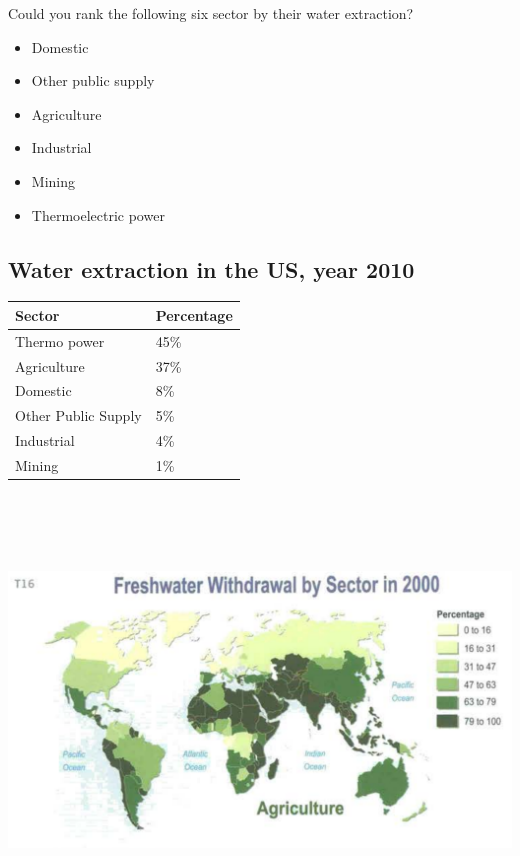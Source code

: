 \documentclass[]{article}
\providecommand{\tightlist}{%
  \setlength{\itemsep}{0pt}\setlength{\parskip}{0pt}}
\begin{document}
Could you rank the following six sector by their water extraction?

\begin{itemize}
\tightlist
\item
  Domestic
\item
  Other public supply
\item
  Agriculture
\item
  Industrial
\item
  Mining
\item
  Thermoelectric power
\end{itemize}

\hypertarget{water-extraction-in-the-us-year-2010}{%
\subsection{Water extraction in the US, year
2010}\label{water-extraction-in-the-us-year-2010}}

\begin{longtable}[]{@{}ll@{}}
\toprule
Sector & Percentage\tabularnewline
\midrule
\endhead
Thermo power & 45\%\tabularnewline
Agriculture & 37\%\tabularnewline
Domestic & 8\%\tabularnewline
Other Public Supply & 5\%\tabularnewline
Industrial & 4\%\tabularnewline
Mining & 1\%\tabularnewline
\bottomrule
\end{longtable}

\hypertarget{section-22}{%
\subsection{}\label{section-22}}

\includegraphics[width=\textwidth,height=4.16667in]{figures/m10_global_agriculture.png}
\end{document}
